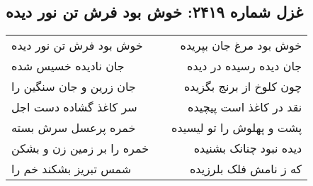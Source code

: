 \begin{center}
\section*{غزل شماره ۲۴۱۹: خوش بود فرش تن نور دیده}
\label{sec:2419}
\begin{longtable}{l p{0.5cm} r}
خوش بود فرش تن نور دیده
&&
خوش بود مرغ جان بپریده
\\
جان نادیده خسیس شده
&&
جان دیده رسیده در دیده
\\
جان زرین و جان سنگین را
&&
چون کلوخ از برنج بگزیده
\\
سر کاغذ گشاده دست اجل
&&
نقد در کاغذ است پیچیده
\\
خمره پرعسل سرش بسته
&&
پشت و پهلوش را تو لیسیده
\\
خمره را بر زمین زن و بشکن
&&
دیده نبود چنانک بشنیده
\\
شمس تبریز بشکند خم را
&&
که ز نامش فلک بلرزیده
\\
\end{longtable}
\end{center}
